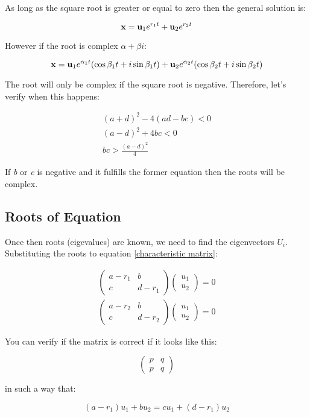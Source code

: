 \documentclass[12pt,letterpaper]{article}
\newcommand{\vectors}[2]{
	\begin{pmatrix}
		#1 \\ #2
	\end{pmatrix}
}
\newcommand{\smatrix}[4]{
	\begin{pmatrix}
		#1 & #2 \\ #3 & #4
	\end{pmatrix}
}
\newcommand{\bmath}[1]{\text{\textbf{#1}}}
\begin{document}
			As long as the square root is greater or equal to zero then the general solution is:

			\begin{equation}
				\bmath{x} =  \bmath{u}_1 e^{r_1 t} + \bmath{u}_2 e^{r_2 t}
			\end{equation}

			However if the root is complex $\alpha + \beta i$:

			\begin{equation}
				\bmath{x} =  \bmath{u}_1 e^{\alpha_1 t} (\cos{\beta_1 t} + i \sin{\beta_1 t}) +\bmath{u}_2 e^{\alpha_2 t} (\cos{\beta_2 t} + i \sin{\beta_2 t})
			\end{equation}

			The root will only be complex if the square root is negative. Therefore, let's verify when this happens:

			\begin{align*}
				(a+d)^2-4(ad-bc) < 0 \\
				(a-d)^2 +4bc < 0 \\ 
				bc > \frac{(a-d)^2}{4}
			\end{align*}

			If \emph{b} or \emph{c} is negative and it fulfills the former equation then the roots will be complex.

		
		\subsection{Roots of Equation}

			Once then roots (eigevalues) are known, we need to find the eigenvectors $U_i$. Substituting the roots to equation \ref{characteristic matrix}:

			\begin{align*}
				\smatrix{a-r_1}{b}{c}{d-r_1} \vectors{u_1}{u_2} = 0 \\ 
				\smatrix{a-r_2}{b}{c}{d-r_2} \vectors{u_1}{u_2} = 0 
			\end{align*}

			You can verify if the matrix is correct if it looks like this:

			\begin{equation*}
				\smatrix{p}{q}{p}{q}
			\end{equation*}

			in such a way that:

			\begin{equation*}
				(a-r_1) u_1 + b u_2 = c u_1 + (d-r_1) u_2
			\end{equation*}
\end{document}
